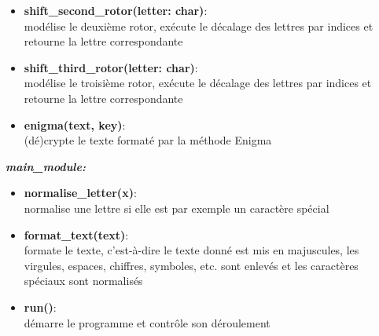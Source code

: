 \documentclass[a4paper,12pt,abstracton,titlepage]{scrartcl}
\begin{document}
{\begin{itemize}
modélise le premier rotor, exécute le décalage des lettres par indices et retourne la lettre correspondante\\
\item \textbf{shift\_second\_rotor(letter: char)}:\\
modélise le deuxième rotor, exécute le décalage des lettres par indices et retourne la lettre correspondante\\
\item \textbf{shift\_third\_rotor(letter: char)}:\\
modélise le troisième rotor, exécute le décalage des lettres par indices et retourne la lettre correspondante\\
\item \textbf{enigma(text, key)}:\\
(dé)crypte le texte formaté par la méthode Enigma\\
\end{itemize}\vspace{0.3cm}


\textit{\textbf{main\_module:}}\vspace{0.2cm}
\begin{itemize}
\item \textbf{normalise\_letter(x)}:\\
normalise une lettre si elle est par exemple un caractère spécial\\
\item \textbf{format\_text(text)}:\\
formate le texte, c'est-à-dire le texte donné est mis en majuscules, les virgules, espaces, chiffres, symboles, etc. sont enlevés et les caractères spéciaux sont normalisés\\
\item \textbf{run()}:\\
démarre le programme et contrôle son déroulement\\
\end{itemize}\vspace{0.3cm}


}
\end{document}
